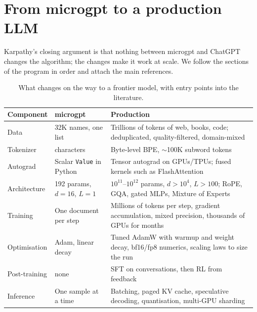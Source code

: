 \documentclass[11pt,letterpaper]{article}
\theoremstyle{remark}
\newcommand{\code}[1]{\lstinline[basicstyle=\ttfamily\small]|#1|}
\begin{document}
\section{From microgpt to a production LLM}
\label{sec:real}

Karpathy's closing argument is that nothing between microgpt and ChatGPT changes the algorithm; the changes make it work at scale. We follow the sections of the program in order and attach the main references.

\begin{table}[h]
\centering\small
\begin{tabularx}{\textwidth}{@{}l>{\raggedright\arraybackslash}p{}X@{}}
\toprule
Component & microgpt & Production \\
\midrule
Data & 32K names, one list & Trillions of tokens of web, books, code; deduplicated, quality-filtered, domain-mixed \parencite{raffel2020t5,gao2020pile,lee2022dedup,penedo2024fineweb} \\
Tokenizer & 27 characters & Byte-level BPE, $\sim$100K subword tokens \parencite{sennrich2016bpe,radford2019gpt2,openai2022tiktoken} \\
Autograd & Scalar \code{Value} in Python & Tensor autograd on GPUs/TPUs; fused kernels such as FlashAttention \parencite{paszke2019pytorch,dao2022flashattention,dao2024flashattention2} \\
Architecture & 4{,}192 params, $d=16$, $L=1$ & $10^{11}$--$10^{12}$ params, $d>10^4$, $L>100$; RoPE, GQA, gated MLPs, Mixture of Experts \parencite{su2021rope,ainslie2023gqa,shazeer2020glu,fedus2022switch,deepseek2024v3} \\
Training & One document per step & Millions of tokens per step, gradient accumulation, mixed precision, thousands of GPUs for months \parencite{micikevicius2018mixed} \\
Optimisation & Adam, linear decay & Tuned AdamW with warmup and weight decay, bf16/fp8 numerics, scaling laws to size the run \parencite{loshchilov2019adamw,kaplan2020scaling,hoffmann2022chinchilla} \\
Post-training & none & SFT on conversations, then RL from feedback \parencite{ouyang2022instructgpt,christiano2017rlhf,schulman2017ppo,rafailov2023dpo,shao2024grpo} \\
Inference & One sample at a time & Batching, paged KV cache, speculative decoding, quantisation, multi-GPU sharding \parencite{yu2022orca,kwon2023vllm,leviathan2023speculative,chen2023speculative,dettmers2022int8,frantar2023gptq} \\
\bottomrule
\end{tabularx}
\caption{What changes on the way to a frontier model, with entry points into the literature.}
\label{tab:real}
\end{table}
\end{document}
